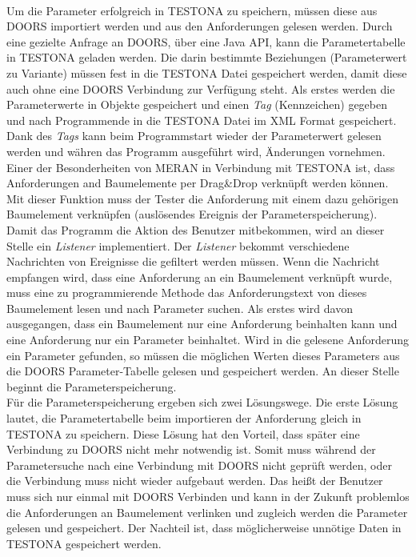 \paragraph{}
 
Um die Parameter erfolgreich in TESTONA zu speichern, müssen diese aus DOORS importiert werden und aus den Anforderungen gelesen werden. Durch eine gezielte Anfrage an DOORS, über eine Java API, kann die Parametertabelle in TESTONA geladen werden. Die darin bestimmte Beziehungen (Parameterwert zu Variante) müssen fest in die TESTONA Datei gespeichert werden, damit diese auch ohne eine DOORS Verbindung zur Verfügung steht. Als erstes werden die Parameterwerte in Objekte gespeichert und einen \textit{Tag} (Kennzeichen) gegeben und nach Programmende in die TESTONA Datei im XML Format gespeichert. Dank des \textit{Tags} kann beim Programmstart wieder der Parameterwert gelesen werden und währen das Programm ausgeführt wird, Änderungen vornehmen.\\

Einer der Besonderheiten von MERAN in Verbindung mit TESTONA ist, dass Anforderungen and Baumelemente per Drag\&Drop verknüpft werden können. Mit dieser Funktion muss der Tester die Anforderung mit einem dazu gehörigen Baumelement verknüpfen (auslösendes Ereignis der Parameterspeicherung). Damit das Programm die Aktion des Benutzer mitbekommen, wird an dieser Stelle ein \textit{Listener} implementiert. Der \textit{Listener} bekommt verschiedene Nachrichten von Ereignisse die gefiltert werden müssen. Wenn die Nachricht empfangen wird, dass eine Anforderung an ein Baumelement verknüpft wurde, muss eine zu programmierende Methode das Anforderungstext von dieses Baumelement lesen und nach Parameter suchen. Als erstes wird davon ausgegangen, dass ein Baumelement nur eine Anforderung beinhalten kann und eine Anforderung nur ein Parameter beinhaltet. Wird in die gelesene Anforderung ein Parameter gefunden, so müssen die möglichen Werten dieses Parameters aus die DOORS Parameter-Tabelle gelesen und gespeichert werden. An dieser Stelle beginnt die Parameterspeicherung.\\

Für die Parameterspeicherung ergeben sich zwei Lösungswege. Die erste Lösung lautet, die Parametertabelle beim importieren der Anforderung gleich in TESTONA zu speichern. Diese Lösung hat den Vorteil, dass später eine Verbindung zu DOORS nicht mehr notwendig ist. Somit muss während der Parametersuche nach eine Verbindung mit DOORS nicht geprüft werden, oder die Verbindung muss nicht wieder aufgebaut werden. Das heißt der Benutzer muss sich nur einmal mit DOORS Verbinden und kann in der Zukunft problemlos die Anforderungen an Baumelement verlinken und zugleich werden die Parameter gelesen und gespeichert. Der Nachteil ist, dass möglicherweise unnötige Daten in TESTONA gespeichert werden.\\

